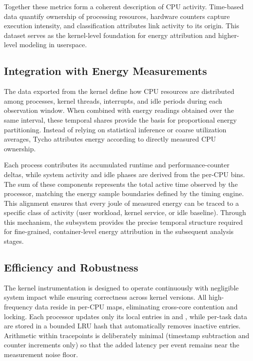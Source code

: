 Together these metrics form a coherent description of CPU activity.  
Time-based data quantify ownership of processing resources, hardware counters capture execution intensity, and classification attributes link activity to its origin.  
This dataset serves as the kernel-level foundation for energy attribution and higher-level modeling in userspace.

\subsection{Integration with Energy Measurements}
\label{subsec:ebpf-collector-integration-energy}

The data exported from the kernel define how CPU resources are distributed among processes, kernel threads, interrupts, and idle periods during each observation window.  
When combined with energy readings obtained over the same interval, these temporal shares provide the basis for proportional energy partitioning.  
Instead of relying on statistical inference or coarse utilization averages, Tycho attributes energy according to directly measured CPU ownership.

Each process contributes its accumulated runtime and performance-counter deltas, while system activity and idle phases are derived from the per-CPU bins.  
The sum of these components represents the total active time observed by the processor, matching the energy sample boundaries defined by the timing engine.  
This alignment ensures that every joule of measured energy can be traced to a specific class of activity (user workload, kernel service, or idle baseline).  
Through this mechanism, the  subsystem provides the precise temporal structure required for fine-grained, container-level energy attribution in the subsequent analysis stages.

\subsection{Efficiency and Robustness}
\label{subsec:ebpf-collector-efficiency}

The kernel instrumentation is designed to operate continuously with negligible system impact while ensuring correctness across kernel versions.  
All high-frequency data reside in per-CPU maps, eliminating cross-core contention and locking.  
Each processor updates only its local entries in  and , while per-task data are stored in a bounded LRU hash that automatically removes inactive entries.  
Arithmetic within tracepoints is deliberately minimal (timestamp subtraction and counter increments only) so that the added latency per event remains near the measurement noise floor.

